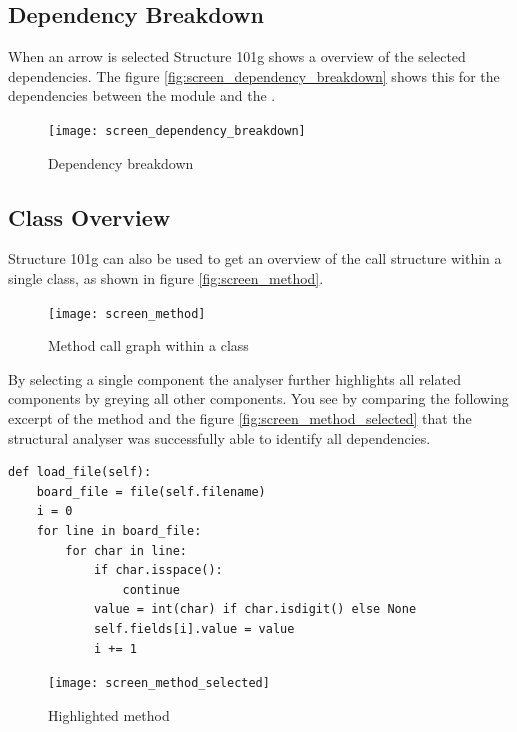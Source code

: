 \documentclass[12pt,halfparskip,DIV11,BCOR10mm]{scrreprt}
\begin{document}
\subsection{Dependency Breakdown}

When an arrow is selected Structure 101g shows a overview of the selected dependencies. The figure \vref{fig:screen_dependency_breakdown} shows this for the dependencies between the module  and the . 

\begin{figure}[H]
    \centering
    \texttt{[image: screen\_dependency\_breakdown]}
    \caption{Dependency breakdown}
    \label{fig:screen_dependency_breakdown}
\end{figure}

\subsection{Class Overview}

Structure 101g can also be used to get an overview of the call structure within a single class, as shown in figure \vref{fig:screen_method}. 

\begin{figure}[H]
    \centering
    \texttt{[image: screen\_method]}
    \caption{Method call graph within a class}
    \label{fig:screen_method}
\end{figure}

By selecting a single component the analyser further highlights all related components by greying all other components. You see by comparing the  following excerpt of the method  and the figure \vref{fig:screen_method_selected} that the structural analyser was successfully able to identify all dependencies.

\begin{lstlisting}
def load_file(self):
    board_file = file(self.filename)
    i = 0        
    for line in board_file:
        for char in line:
            if char.isspace():
                continue
            value = int(char) if char.isdigit() else None
            self.fields[i].value = value
            i += 1
\end{lstlisting}

\begin{figure}[H]
    \centering
    \texttt{[image: screen\_method\_selected]}
    \caption{Highlighted method}
    \label{fig:screen_method_selected}
\end{figure}
\end{document}
